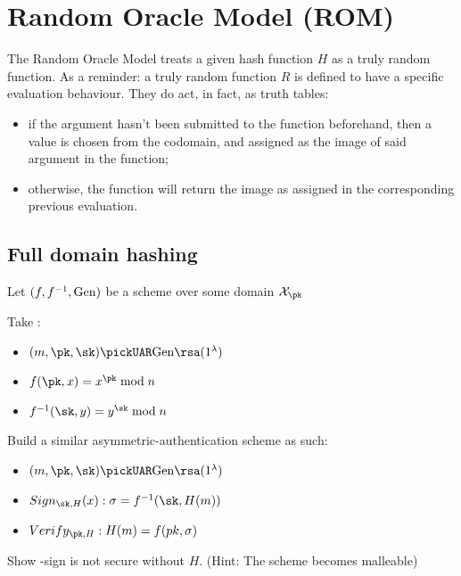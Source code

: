 
\section{Random Oracle Model (ROM)}

The Random Oracle Model treats a given hash function $H$ as a truly random function. As a reminder: a truly random function $R$ is defined to have a specific evaluation behaviour. They do act, in fact, as truth tables\footnotemark:

\begin{itemize}
    \item if the argument hasn't been submitted to the function beforehand, then a value is chosen \uar{} from the codomain, and assigned as the image of said argument in the function;
    \item otherwise, the function will return the image as assigned in the corresponding previous evaluation.
\end{itemize}


\subsection{Full domain hashing}

Let $(f, f^{-1}, \mathrm{Gen})$ be a \tdp{} scheme over some domain $\mathcal{X}_{\pk}$

Take \rsa:
\begin{itemize}
    \item $(m, \pk, \sk) \pickUAR \Gen\rsa(1^\lambda)$
    \item $f(\pk, x) = x^{\pk} \mod n$
    \item $f^{-1}(\sk, y) = y^{\sk} \mod n$
\end{itemize}

Build a similar asymmetric-authentication scheme as such:

\begin{itemize}
    \item $(m, \pk, \sk) \pickUAR \Gen\rsa(1^\lambda)$
    \item $Sign_{\sk, H}(x): \sigma = f^{-1}(\sk, H(m))$
    \item $Verify_{\pk, H}: H(m) = f(pk, \sigma)$
\end{itemize}

\begin{exercise}
    Show \rsa-sign is not secure without $H$. (Hint: The scheme becomes malleable)
\end{exercise}

